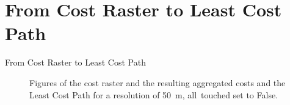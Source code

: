 \documentclass[usenames,dvipsnames,aspectratio=169]{beamer}
\begin{document}
	\section{From Cost Raster to Least Cost Path}
	\begin{frame}{From Cost Raster to Least Cost Path}
		\begin{figure}
			\centering
			\enskip
			\enskip
			
			\caption{Figures of the cost raster and the resulting aggregated costs and the Least Cost Path for a resolution of 50~m, all~touched set to False.}
			\label{fig:costs2path}
		\end{figure}
	\end{frame}
	
\end{document}
